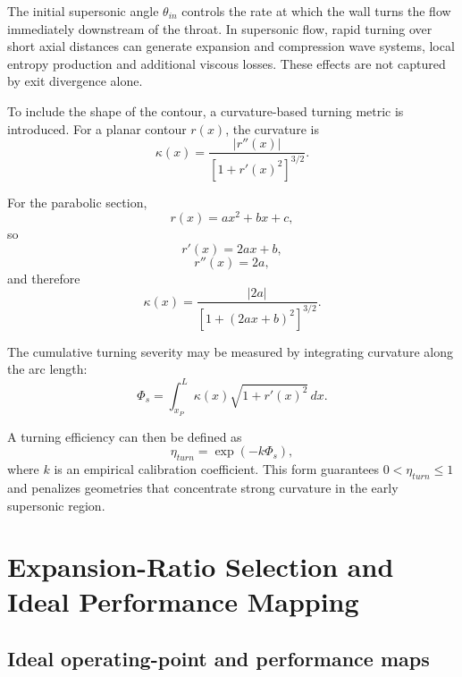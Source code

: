 \documentclass[11pt,a4paper]{article}
\begin{document}
The initial supersonic angle $\theta_{in}$ controls the rate at which the wall turns the flow immediately downstream of the throat. In supersonic flow, rapid turning over short axial distances can generate expansion and compression wave systems, local entropy production and additional viscous losses. These effects are not captured by exit divergence alone.

To include the shape of the contour, a curvature-based turning metric is introduced. For a planar contour $r(x)$, the curvature is
\begin{equation}
\kappa(x)=\frac{|r''(x)|}{\left[1+r'(x)^2\right]^{3/2}}.
\label{eq:curvature_general}
\end{equation}

For the parabolic section,
\begin{equation}
r(x)=ax^2+bx+c,
\end{equation}
so
\begin{equation}
r'(x)=2ax+b,
\end{equation}
\begin{equation}
r''(x)=2a,
\end{equation}
and therefore
\begin{equation}
\kappa(x)=\frac{|2a|}{\left[1+(2ax+b)^2\right]^{3/2}}.
\label{eq:curvature_parabola}
\end{equation}

The cumulative turning severity may be measured by integrating curvature along the arc length:
\begin{equation}
\Phi_s=\int_{x_P}^{L}\kappa(x)\sqrt{1+r'(x)^2}\,dx.
\label{eq:Phi_s}
\end{equation}

A turning efficiency can then be defined as
\begin{equation}
\boxed{\eta_{turn}=\exp(-k\Phi_s)},
\label{eq:eta_turn}
\end{equation}
where $k$ is an empirical calibration coefficient. This form guarantees $0<\eta_{turn}\leq1$ and penalizes geometries that concentrate strong curvature in the early supersonic region.

\newpage


\section{Expansion-Ratio Selection and Ideal Performance Mapping}

\subsection{Ideal operating-point and performance maps}
\end{document}
